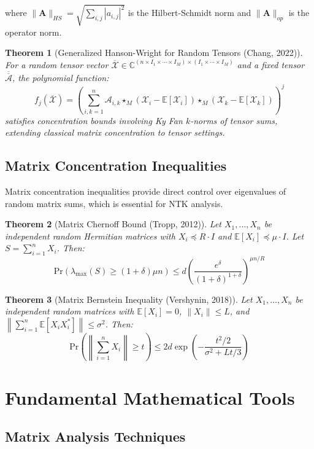 \documentclass{article}
\newtheorem{theorem}{Theorem}[section]
\newcommand{\E}{\mathbb{E}}
\newcommand{\C}{\mathbb{C}}
\newcommand{\Pr}{\text{Pr}}
\begin{document}
where $\|\mathbf{A}\|_{HS} = \sqrt{\sum_{i,j} |a_{i,j}|^2}$ is the Hilbert-Schmidt norm and $\|\mathbf{A}\|_{op}$ is the operator norm.

\begin{theorem}[Generalized Hanson-Wright for Random Tensors (Chang, 2022)]
For a random tensor vector $\overline{\mathcal{X}} \in \C^{(n \times I_1 \times \cdots \times I_M) \times (I_1 \times \cdots \times I_M)}$ and a fixed tensor $\overline{\overline{\mathcal{A}}}$, the polynomial function:
$$f_j(\overline{\mathcal{X}}) = \left(\sum_{i,k=1}^n \mathcal{A}_{i,k} \star_M (\mathcal{X}_i - \E[\mathcal{X}_i]) \star_M (\mathcal{X}_k - \E[\mathcal{X}_k])\right)^j$$
satisfies concentration bounds involving Ky Fan $k$-norms of tensor sums, extending classical matrix concentration to tensor settings.
\end{theorem}

\subsection{Matrix Concentration Inequalities}

Matrix concentration inequalities provide direct control over eigenvalues of random matrix sums, which is essential for NTK analysis.

\begin{theorem}[Matrix Chernoff Bound (Tropp, 2012)]
Let $X_1, \ldots, X_n$ be independent random Hermitian matrices with $X_i \preceq R \cdot I$ and $\E[X_i] \preceq \mu \cdot I$. Let $S = \sum_{i=1}^n X_i$. Then:
$$\Pr(\lambda_{\max}(S) \geq (1+\delta)\mu n) \leq d \left(\frac{e^\delta}{(1+\delta)^{1+\delta}}\right)^{\mu n / R}$$
\end{theorem}

\begin{theorem}[Matrix Bernstein Inequality (Vershynin, 2018)]
Let $X_1, \ldots, X_n$ be independent random matrices with $\E[X_i] = 0$, $\|X_i\| \leq L$, and $\left\|\sum_{i=1}^n \E[X_i X_i^*]\right\| \leq \sigma^2$. Then:
$$\Pr\left(\left\|\sum_{i=1}^n X_i\right\| \geq t\right) \leq 2d \exp\left(-\frac{t^2/2}{\sigma^2 + Lt/3}\right)$$
\end{theorem}

\section{Fundamental Mathematical Tools}

\subsection{Matrix Analysis Techniques}
\end{document}
